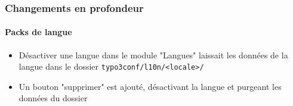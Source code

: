 \begin{frame}[fragile]
	\frametitle{Changements en profondeur}
	\framesubtitle{Packs de langue}

	\begin{itemize}
		\item Désactiver une langue dans le module "Langues" laissait les données
			de la langue dans le dossier \texttt{typo3conf/l10n/<locale>/}
		\item Un bouton "supprimer" est ajouté, désactivant la langue et purgeant
			les données du dossier
	\end{itemize}

\end{frame}








